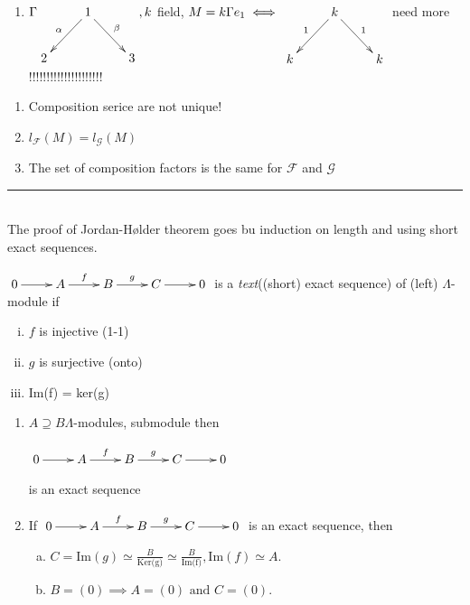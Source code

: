 \begin{exam}
\begin{enumerate}[(1)]
\item $\G \xymatrix{ & 1\ar[dr]^{\beta} \ar[dl]_{\alpha} & \\ 2 & & 3  } , k$ field, $ M = k\G e_1 \iff \xymatrix{ & k\ar[dr]^{1} \ar[dl]_{1} & \\ k & & k }\\$
need more	!!!!!!!!!!!!!!!!!!!!!
\end{enumerate}
\end{exam}

\begin{note}
	\begin{enumerate}[(1)]
		\item Composition serice are not unique!
		\item $l_{\mathscr{F}}(M) = l_{\mathscr{G}}(M)$
		\item The set of composition factors is the same for $\mathscr{F}$ and $\mathscr{G}$
	\end{enumerate}
\end{note}
\rule{\textwidth}{1pt}\\
The proof of Jordan-Hølder theorem goes bu induction on length and using short exact sequences.
\begin{defin}
	$\xymatrix{0 \ar[r] & A\ar[r]^f & B\ar[r]^g & C \ar[r] & 0}$ is a \emph{text}((short) exact sequence) of (left) $\Lambda$-module if
	\begin{enumerate}[(i)]
		\item $f$ is injective (1-1)
		\item $g$ is surjective (onto)
		\item Im(f) = ker(g)
	\end{enumerate}
\end{defin} 
\begin{note}
	\begin{enumerate}[(1)]
		\item $A \supseteq B \Lambda$-modules, submodule then\\
		\begin{center}
			$\xymatrix{0 \ar[r] & A\ar[r]^f & B\ar[r]^g & C \ar[r] & 0}$
		\end{center}
	is an exact sequence
	\item If $\xymatrix{0 \ar[r] & A\ar[r]^f & B\ar[r]^g & C \ar[r] & 0}$ is an exact sequence, then
	\begin{enumerate}[(a)]
		\item $C = \text{Im}(g) \simeq \frac{B}{\text{Ker(g)}} \simeq \frac{B}{\text{Im(f)}}, \text{Im}(f)\simeq A. $
		\item $B = (0) \implies A = (0) \text{ and } C=(0). $ 
	\end{enumerate}
	\end{enumerate}
\end{note}

